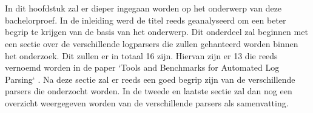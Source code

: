 \chapter{}
\label{ch:stand-van-zaken}






In dit hoofdstuk zal er dieper ingegaan worden op het onderwerp van deze bachelorproef. In de inleiding werd de titel reeds geanalyseerd om een beter begrip te krijgen van de basis van het onderwerp. Dit onderdeel zal beginnen met een sectie over de verschillende logparsers die zullen gehanteerd worden binnen het onderzoek. Dit zullen er in totaal 16 zijn. Hiervan zijn er 13 die reeds vernoemd worden in de paper `Tools and Benchmarks for Automated Log Parsing` \autocite{TBA2019}. Na deze sectie zal er reeds een goed begrip zijn van de verschillende parsers die onderzocht worden. In de tweede en laatste sectie zal dan nog een overzicht weergegeven worden van de verschillende parsers als samenvatting.


